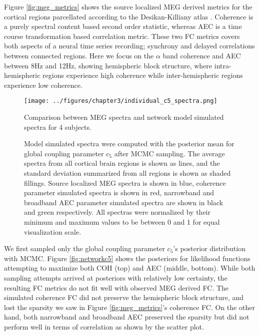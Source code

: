 Figure \ref{fig:meg_metrics} shows the source localized MEG derived metrics for the cortical regions parcellated according to the Desikan-Killiany atlas \cite{Desikan2006}. Coherence is a purely spectral content based second order statistic, whereas AEC is a time course transformation based correlation metric. These two FC metrics covers both aspects of a neural time series recording; synchrony and delayed correlations between connected regions. Here we focus on the $\alpha$ band coherence and AEC between 8Hz and 12Hz, showing hemispheric block structure, where intra-hemispheric regions experience high coherence while inter-hemispheric regions experience low coherence.

\begin{figure}[htbp]
    \centering
    \texttt{[image: ../figures/chapter3/individual\_c5\_spectra.png]}
    \caption{Comparison between MEG spectra and network model simulated spectra for 4 subjects.}
    \caption*{Model simulated spectra were computed with the posterior mean for global coupling parameter $c_5$ after MCMC sampling. The average spectra from all cortical brain regions is shown as lines, and the standard deviation summarized from all regions is shown as shaded fillings. Source localized MEG spectra is shown in blue, coherence parameter simulated spectra is shown in red, narrowband and broadband AEC parameter simulated spectra are shown in black and green respectively. All spectras were normalized by their minimum and maximum values to be between 0 and 1 for equal visualization scale.}
    \label{fig:c5_spectra}
\end{figure}

We first sampled only the global coupling parameter $c_5$'s posterior distribution with MCMC. Figure \ref{fig:networkc5} shows the posteriors for likelihood functions attempting to maximize both COH (top) and AEC (middle, bottom). While both sampling attempts arrived at posteriors with relatively low certainty, the resulting FC metrics do not fit well with observed MEG derived FC. The simulated coherence FC did not preserve the hemispheric block structure, and lost the sparsity we saw in Figure \ref{fig:meg_metrics}'s coherence FC. On the other hand, both narrowband and broadband AEC preserved the sparsity but did not perform well in terms of correlation as shown by the scatter plot. 

